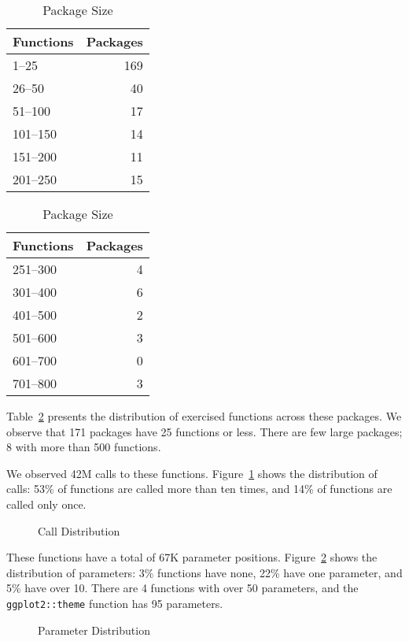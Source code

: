 \documentclass[sigplan,screen]{acmart}
\begin{document}
\begin{table}[!h]    \small
  \caption{Package Size} \label{table:packsize}  \centering
  \begin{tabular}{lr}    \toprule
    \bf Functions&\bf Packages\\    \midrule
    1--25&169\\
    26--50&40\\
    51--100&17\\
    101--150&14\\
    151--200&11\\
    201--250&15\\    \bottomrule
  \end{tabular}
  \quad
  \begin{tabular}{lr}    \toprule
    \bf Functions&\bf Packages\\    \midrule
    251--300&4\\
    301--400&6\\
    401--500&2\\
    501--600&3\\
    601--700&0\\
    701--800&3\\    \bottomrule
  \end{tabular}
\end{table}

Table~\ref{table:packsize} presents the
distribution of exercised functions across these packages. We observe that 171
packages have 25 functions or less. There are few large packages; 8 with more
than 500 functions.

\noindent
We observed 42M calls to these functions. Figure~\ref{fig:calldist} shows the
distribution of calls: 53\% of functions are called more than ten times, and 14\% of
functions are called only once.

\begin{figure}[!h]
  \centering
  
  \caption{Call Distribution}
  \label{fig:calldist}
\end{figure}

\noindent
These functions have a total of 67K parameter positions.
Figure~\ref{fig:paramdist} shows the distribution of parameters: 3\% functions
have none, 22\% have one parameter, and 5\% have over 10. There are 4 functions
with over 50 parameters, and the \texttt{ggplot2::theme} function has 95
parameters.

\begin{figure}[!h]  \centering
  
  \caption{Parameter Distribution}
  \label{fig:paramdist}
\end{figure}
\end{document}
